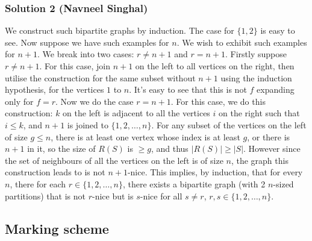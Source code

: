 \subsubsection{Solution 2 (Navneel Singhal)}
We construct such bipartite graphs by induction. The case for $\{1, 2\}$ is easy to see.\nl
Now suppose we have such examples for $n$. We wish to exhibit such examples for $n+1$. We break into two cases: $r \ne n+1$ and $r = n+1$.\nl
Firstly suppose $r \ne n+1$. For this case, join $n+1$ on the left to all vertices on the right, then utilise the construction for the same subset without $n+1$ using the induction hypothesis, for the vertices $1$ to $n$. It's easy to see that this is not $f$ expanding only for $f = r$.\nl
Now we do the case $r = n+1$. For this case, we do this construction: $k$ on the left is adjacent to all the vertices $i$ on the right such that $i \le k$, and $n+1$ is joined to $\{1, 2, \dots, n\}$. For any subset of the vertices on the left of size $g \le n$, there is at least one vertex whose index is at least $g$, or there is $n+1$ in it, so the size of $R(S)$ is $\ge g$, and thus $|R(S)| \ge |S|$. However since the set of neighbours of all the vertices on the left is of size $n$,
the graph this construction leads to is not $n+1$-nice.\nl
This implies, by induction, that for every $n$, there for each $r \in \{1, 2, \dots, n\}$, there exists a bipartite graph (with 2 $n$-sized partitions) that is not $r$-nice but is $s$-nice for all $s \ne r$, $r, s \in \{1, 2, \dots, n\}$.

\subsection{Marking scheme}
\begin{enumerate}
        \begin{enumerate}
        \end{enumerate}
\end{enumerate}


